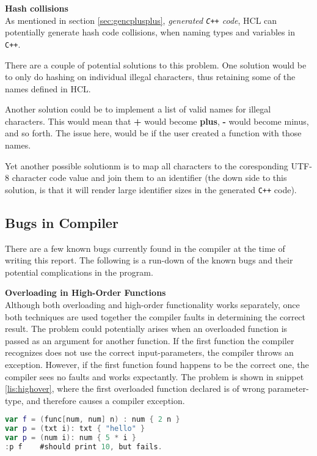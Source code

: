 \textbf{Hash collisions}\\
As mentioned in section \ref{sec:gencplusplus}, \textit{generated \texttt{C++} code}, HCL can potentially generate hash code collisions, when naming types and variables in \texttt{C++}.

There are a couple of potential solutions to this problem.
One solution would be to only do hashing on individual illegal characters, thus retaining some of the names defined in HCL.

Another solution could be to implement a list of valid names for illegal characters.
This would mean that \textbf{+} would become \textbf{plus}, \textbf{-} would become minus, and so forth.
The issue here, would be if the user created a function with those names.

Yet another possible solutionm is to map all characters to the coresponding UTF-8 character code value and join them to an identifier (the down side to this solution, is that it will render large identifier sizes in the generated \texttt{C++} code).

\subsection{Bugs in Compiler}
There are a few known bugs currently found in the compiler at the time of writing this report. 
The following is a run-down of the known bugs and their potential complications in the program. 

\textbf{Overloading in High-Order Functions}\\
Although both overloading and high-order functionality works separately, once both techniques are used together the compiler faults in determining the correct result.
The problem could potentially arises when an overloaded function is passed as an argument for another function. 
If the first function the compiler recognizes does not use the correct input-parameters, the compiler throws an exception.
However, if the first function found happens to be the correct one, the compiler sees no faults and works expectantly.
The problem is shown in snippet \ref{lis:highover}, where the first overloaded function declared is of wrong parameter-type, and therefore causes a compiler exception. 
\begin{lstlisting}[language=Kotlin,label=lis:highover,caption=Overloading in high-order functions problem.]
var f = (func[num, num] n) : num { 2 n }
var p = (txt i): txt { "hello" }
var p = (num i): num { 5 * i }
:p f 	#should print 10, but fails. 
\end{lstlisting}

